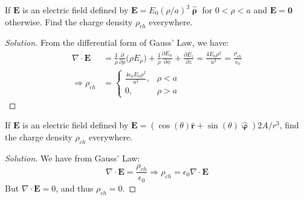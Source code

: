 \documentclass[crop=false,class=book,oneside]{standalone}
\begin{document}
            \begin{problem}[Wangsness 4-11]
                If $\mathbf{E}$ is an electric field defined by
                $\mathbf{E}=E_{0}(\rho/a)^{3}\hat{\boldsymbol{\uprho}}$
                for $0<\rho<a$ and $\mathbf{E}=\mathbf{0}$ otherwise.
                Find the charge density $\rho_{ch}$ everywhere.
            \end{problem}
            \begin{proof}[Solution]
                From the differential form of Gauss' Law, we have:
                \begin{align*}
                    \nabla\cdot\mathbf{E}
                    &=\frac{1}{\rho}\frac{\partial}{\partial\rho}
                    \big(\rho{E}_{\rho}\big)
                    +\frac{1}{\rho}
                    \frac{\partial{E_{\phi}}}{\partial\phi}
                    +\frac{\partial{E_{z}}}{\partial{z}}
                    =\frac{4E_{0}\rho^{2}}{a^{3}}
                    =\frac{\rho_{ch}}{\epsilon_{0}}\\
                    \Rightarrow\rho_{ch}
                    &=
                    \begin{cases}
                        \frac{4\epsilon_{0}E_{0}\rho^{2}}{a^{3}},
                        &\rho<a\\
                        0,
                        &\rho>a
                    \end{cases}
                \end{align*}
            \end{proof}
            \begin{problem}[Wangsness 4-12]
                If $\mathbf{E}$ is an electric field defined by
                $\mathbf{E}%
                 =(\cos(\theta)\hat{\mathbf{r}}%
                 +\sin(\theta)\hat{\boldsymbol{\upvarphi}})2A/r^{3}$,
                find the charge density $\rho_{ch}$ everywhere.
            \end{problem}
            \begin{proof}[Solution]
                We have from Gauss' Law:
                \begin{equation*}
                    \nabla\cdot\mathbf{E}=\frac{\rho_{ch}}{\epsilon_{0}}
                    \Rightarrow\rho_{ch}=\epsilon_{0}\nabla\cdot\mathbf{E}
                \end{equation*}
                But $\nabla\cdot\mathbf{E}=0$, and thus $\rho_{ch}=0$.
            \end{proof}
\end{document}
